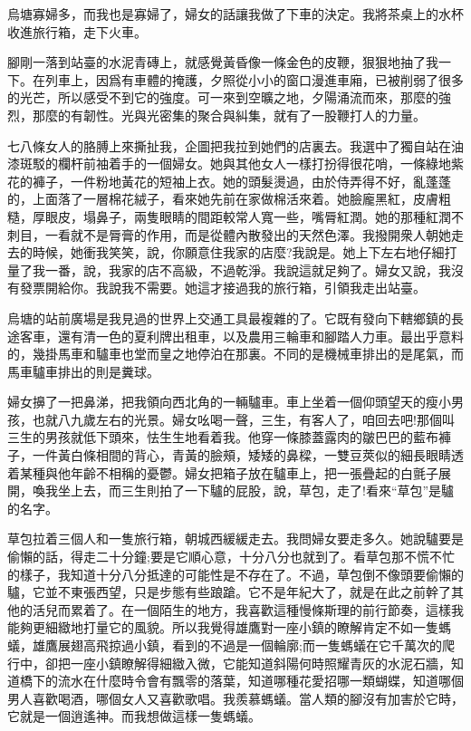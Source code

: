 \documentclass[a6paper]{article}
\begin{document}
烏塘寡婦多，而我也是寡婦了，婦女的話讓我做了下車的決定。我將茶桌上的水杯收進旅行箱，走下火車。

腳剛一落到站臺的水泥青磚上，就感覺黃昏像一條金色的皮鞭，狠狠地抽了我一下。在列車上，因爲有車體的掩護，夕照從小小的窗口漫進車廂，已被削弱了很多的光芒，所以感受不到它的強度。可一來到空曠之地，夕陽涌流而來，那麼的強烈，那麼的有韌性。光與光密集的聚合與糾集，就有了一股鞭打人的力量。

七八條女人的胳膊上來撕扯我，企圖把我拉到她們的店裏去。我選中了獨自站在油漆斑駁的欄杆前袖着手的一個婦女。她與其他女人一樣打扮得很花哨，一條綠地紫花的褲子，一件粉地黃花的短袖上衣。她的頭髮燙過，由於侍弄得不好，亂蓬蓬的，上面落了一層棉花絨子，看來她先前在家做棉活來着。她臉龐黑紅，皮膚粗糙，厚眼皮，塌鼻子，兩隻眼睛的間距較常人寬一些，嘴脣紅潤。她的那種紅潤不刺目，一看就不是脣膏的作用，而是從體內散發出的天然色澤。我撥開衆人朝她走去的時候，她衝我笑笑，說，你願意住我家的店麼?我說是。她上下左右地仔細打量了我一番，說，我家的店不高級，不過乾淨。我說這就足夠了。婦女又說，我沒有發票開給你。我說我不需要。她這才接過我的旅行箱，引領我走出站臺。

烏塘的站前廣場是我見過的世界上交通工具最複雜的了。它既有發向下轄鄉鎮的長途客車，還有清一色的夏利牌出租車，以及農用三輪車和腳踏人力車。最出乎意料的，幾掛馬車和驢車也堂而皇之地停泊在那裏。不同的是機械車排出的是尾氣，而馬車驢車排出的則是糞球。

婦女擤了一把鼻涕，把我領向西北角的一輛驢車。車上坐着一個仰頭望天的瘦小男孩，也就八九歲左右的光景。婦女吆喝一聲，三生，有客人了，咱回去吧!那個叫三生的男孩就低下頭來，怯生生地看着我。他穿一條膝蓋露肉的皺巴巴的藍布褲子，一件黃白條相間的背心，青黃的臉頰，矮矮的鼻樑，一雙豆莢似的細長眼睛透着某種與他年齡不相稱的憂鬱。婦女把箱子放在驢車上，把一張疊起的白氈子展開，喚我坐上去，而三生則拍了一下驢的屁股，說，草包，走了!看來“草包”是驢的名字。

草包拉着三個人和一隻旅行箱，朝城西緩緩走去。我問婦女要走多久。她說驢要是偷懶的話，得走二十分鐘;要是它順心意，十分八分也就到了。看草包那不慌不忙的樣子，我知道十分八分抵達的可能性是不存在了。不過，草包倒不像頭要偷懶的驢，它並不東張西望，只是步態有些踉蹌。它不是年紀大了，就是在此之前幹了其他的活兒而累着了。在一個陌生的地方，我喜歡這種慢條斯理的前行節奏，這樣我能夠更細緻地打量它的風貌。所以我覺得雄鷹對一座小鎮的瞭解肯定不如一隻螞蟻，雄鷹展翅高飛掠過小鎮，看到的不過是一個輪廓;而一隻螞蟻在它千萬次的爬行中，卻把一座小鎮瞭解得細緻入微，它能知道斜陽何時照耀青灰的水泥石牆，知道橋下的流水在什麼時令會有飄零的落葉，知道哪種花愛招哪一類蝴蝶，知道哪個男人喜歡喝酒，哪個女人又喜歡歌唱。我羨慕螞蟻。當人類的腳沒有加害於它時，它就是一個逍遙神。而我想做這樣一隻螞蟻。
\end{document}
